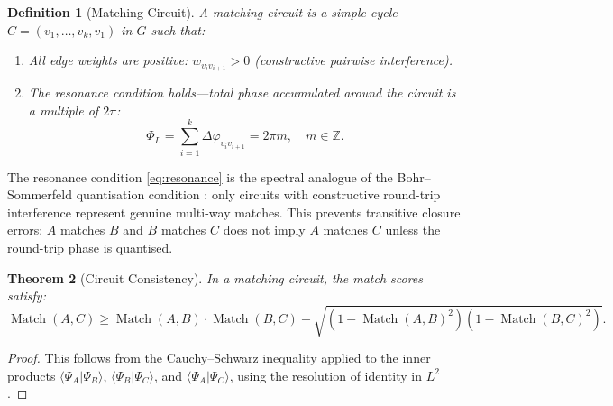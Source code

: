 \documentclass[11pt,twocolumn,a4paper]{article}
\newtheorem{theorem}{Theorem}[section]
\newtheorem{definition}[theorem]{Definition}
\newcommand{\Z}{\mathbb{Z}}
\DeclareMathOperator{\Match}{Match}
\begin{document}
\begin{definition}[Matching Circuit]
\label{def:matching_circuit}
A \emph{matching circuit} is a simple cycle $C = (v_1, \ldots, v_k, v_1)$
in $G$ such that:
\begin{enumerate}[label=(\roman*),nosep]
  \item All edge weights are positive: $w_{v_i v_{i+1}} > 0$ (constructive
    pairwise interference).
  \item The resonance condition holds---total phase accumulated around
    the circuit is a multiple of $2\pi$:
    \begin{equation}
    \label{eq:resonance}
      \Phi_L = \sum_{i=1}^{k} \Delta\varphi_{v_i v_{i+1}} = 2\pi m,
      \quad m \in \Z.
    \end{equation}
\end{enumerate}
\end{definition}

The resonance condition \eqref{eq:resonance} is the spectral analogue
of the Bohr--Sommerfeld quantisation condition \citep{bohr1913}: only
circuits with constructive round-trip interference represent genuine
multi-way matches. This prevents transitive closure errors: $A$ matches
$B$ and $B$ matches $C$ does not imply $A$ matches $C$ unless the
round-trip phase is quantised.


\begin{theorem}[Circuit Consistency]
\label{thm:circuit_consistency}
In a matching circuit, the match scores satisfy:
\begin{equation}
\label{eq:circuit_inequality}
  \Match(A, C) \geq \Match(A, B) \cdot \Match(B, C)
    - \sqrt{(1 - \Match(A,B)^2)(1 - \Match(B,C)^2)}.
\end{equation}
\end{theorem}

\begin{proof}
This follows from the Cauchy--Schwarz inequality applied to the inner
products $\langle\Psi_A|\Psi_B\rangle$,
$\langle\Psi_B|\Psi_C\rangle$, and $\langle\Psi_A|\Psi_C\rangle$,
using the resolution of identity in $L^2$ \citep{meyer2000}.
\end{proof}


\end{document}
